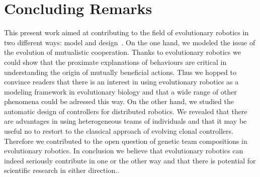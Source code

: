 

\section{Concluding Remarks}

	This present work aimed at contributing to the field of evolutionary robotics in two different ways: model and design~\parencite{Trianni2014b, Doncieux2015a}. On the one hand, we modeled the issue of the evolution of mutualistic cooperation. Thanks to evolutionary robotics we could show that the proximate explanations of behaviours are critical in understanding the origin of mutually beneficial actions. Thus we hopped to convince readers that there is an interest in using evolutionary robotics as a modeling framework in evolutionary biology and that a wide range of other phenomena could be adressed this way. On the other hand, we studied the automatic design of controllers for distributed robotics. We revealed that there are advantages in using heterogeneous teams of individuals and that it may be useful no to restort to the classical approach of evolving clonal controllers. Therefore we contributed to the open question of genetic team compositions in evolutionary robotics. In conclusion we believe that evolutionary robotics can indeed seriously contribute in one or the other way and that there is potential for scientific research in either direction..
